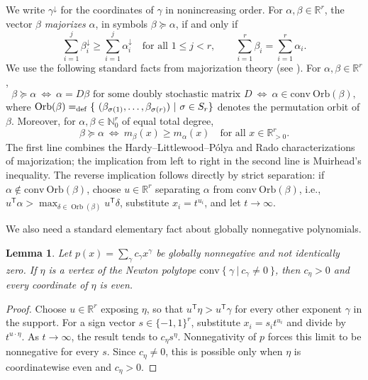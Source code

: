 \documentclass[11pt]{article}
\newtheorem{lemma}[definition]{Lemma}
\newcommand{\Nat}{\mathbb{N}}
\newcommand{\Real}{\mathbb{R}}
\newcommand{\conv}{\mathrm{conv}}
\newcommand{\Orb}{\mathrm{Orb}}
\theoremstyle{remark}
\begin{document}
We write $\gamma^\downarrow$ for the coordinates of $\gamma$ in
nonincreasing order.  
For $\alpha,\beta\in\Real^r$, the vector $\beta$ {\em majorizes} $\alpha$, in symbols $\beta\succeq\alpha$, if and only if 
\begin{equation}\label{eq:majorization}
  \sum_{i=1}^j\beta_i^\downarrow
  \geq\sum_{i=1}^j\alpha_i^\downarrow\quad
  \textrm{for all $1\le j<r$},
  \qquad
  \sum_{i=1}^r\beta_i=\sum_{i=1}^r\alpha_i.
\end{equation}
We use the following standard facts from majorization theory (see \cite[Sections~2.B, 3.G, and 4.C]{marshall-olkin-arnold-2011}). For $\alpha,\beta\in\Real^r$,
\[
  \beta\succeq\alpha
  ~\Longleftrightarrow~
  \alpha=D\beta
  \text{ for some doubly stochastic matrix }D
  ~\Longleftrightarrow~
  \alpha\in\conv\ \Orb(\beta),
\]
where $\Orb(\beta)=_{\rm def}\{~(\beta_{\sigma(1)}, \dots, \beta_{\sigma(r)})~|~\sigma\in S_r\}$ denotes the permutation orbit of $\beta$.
Moreover, for $\alpha,\beta\in\Nat_0^r$ of equal total degree,
\begin{equation}
  \beta\succeq\alpha
  ~\Longleftrightarrow~
  m_\beta(x)\geq m_\alpha(x)
  \quad\text{for all }x\in\Real_{>0}^r. \label{eq:muirhead}
\end{equation}
The first line combines the Hardy--Littlewood--Pólya and Rado
characterizations of majorization; the implication from left to right in the second line is Muirhead's inequality.  The reverse implication follows directly by strict separation: if $\alpha\notin\conv\ \Orb(\beta)$, choose $u\in\Real^r$ separating $\alpha$ from $\conv\ \Orb(\beta)$, i.e., $u^{\mathsf T}\alpha> \max_{\delta\in\operatorname{Orb}(\beta)}u^{\mathsf T}\delta$, substitute $x_i=t^{u_i}$, and let $t\to\infty$.


We also need a standard elementary fact about globally nonnegative polynomials.  

\begin{lemma}\label{lem:vertex-terms}
Let $p(x)=\sum_\gamma c_\gamma x^\gamma$ be globally nonnegative and not identically zero.  If $\eta$ is a vertex of the Newton polytope
$\conv\ \{~\gamma~|~c_\gamma\neq 0~\}$, then $c_\eta>0$ and every coordinate of
$\eta$ is even.
\end{lemma}

\begin{proof}
Choose $u\in\Real^r$ exposing $\eta$, so that
$u^{\mathsf T}\eta>u^{\mathsf T}\gamma$ for every other exponent $\gamma$ in the
support.  For a sign vector $s\in\{-1,1\}^r$, substitute
$x_i=s_i t^{u_i}$ and divide by $t^{u\cdot\eta}$.  As $t\to\infty$, the
result tends to $c_\eta s^\eta$.  Nonnegativity of $p$ forces this limit to
be nonnegative for every $s$.  Since $c_\eta\neq 0$, this is possible only
when $\eta$ is coordinatewise even and $c_\eta>0$.
\end{proof}
\end{document}
